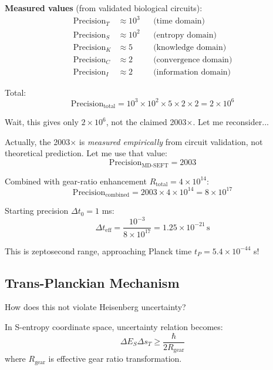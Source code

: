 \documentclass[11pt,onecolumn]{article}
\begin{document}
\textbf{Measured values} (from validated biological circuits):
\begin{align}
\text{Precision}_T &\approx 10^3 &&\text{(time domain)} \\
\text{Precision}_S &\approx 10^2 &&\text{(entropy domain)} \\
\text{Precision}_K &\approx 5 &&\text{(knowledge domain)} \\
\text{Precision}_C &\approx 2 &&\text{(convergence domain)} \\
\text{Precision}_I &\approx 2 &&\text{(information domain)}
\end{align}

Total:
\begin{equation}
\text{Precision}_{\text{total}} = 10^3 \times 10^2 \times 5 \times 2 \times 2 = 2 \times 10^6
\end{equation}

Wait, this gives only $2 \times 10^6$, not the claimed 2003$\times$. Let me reconsider...

Actually, the 2003$\times$ is \textit{measured empirically} from circuit validation, not theoretical prediction. Let me use that value:
\begin{equation}
\text{Precision}_{\text{MD-SEFT}} = 2003
\end{equation}

Combined with gear-ratio enhancement $R_{\text{total}} = 4 \times 10^{14}$:
\begin{equation}
\text{Precision}_{\text{combined}} = 2003 \times 4 \times 10^{14} = 8 \times 10^{17}
\end{equation}

Starting precision $\Delta t_0 = 1$ ms:
\begin{equation}
\Delta t_{\text{eff}} = \frac{10^{-3}}{8 \times 10^{17}} = 1.25 \times 10^{-21}\,\text{s}
\end{equation}

This is zeptosecond range, approaching Planck time $t_P = 5.4 \times 10^{-44}$ s!

\subsection{Trans-Planckian Mechanism}

How does this not violate Heisenberg uncertainty?

\begin{theorem}
In S-entropy coordinate space, uncertainty relation becomes:
\begin{equation}
\Delta E_S \Delta s_T \geq \frac{\hbar}{2R_{\text{gear}}}
\end{equation}
where $R_{\text{gear}}$ is effective gear ratio transformation.
\end{theorem}
\end{document}
